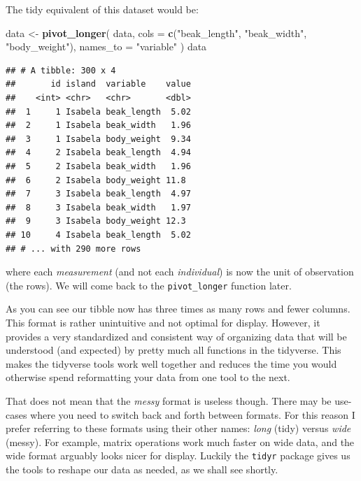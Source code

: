 \documentclass[]{book}
\newenvironment{Shaded}{}{}
\newcommand{\DataTypeTok}[1]{\textcolor[rgb]{0.56,0.13,0.00}{#1}}
\newcommand{\KeywordTok}[1]{\textcolor[rgb]{0.00,0.44,0.13}{\textbf{#1}}}
\newcommand{\NormalTok}[1]{#1}
\newcommand{\StringTok}[1]{\textcolor[rgb]{0.25,0.44,0.63}{#1}}
\begin{document}
The tidy equivalent of this dataset would be:

\begin{Shaded}
\begin{Highlighting}[]
\NormalTok{data <-}\StringTok{ }\KeywordTok{pivot_longer}\NormalTok{(}
\NormalTok{  data, }
  \DataTypeTok{cols =} \KeywordTok{c}\NormalTok{(}\StringTok{"beak_length"}\NormalTok{, }\StringTok{"beak_width"}\NormalTok{, }\StringTok{"body_weight"}\NormalTok{),}
  \DataTypeTok{names_to =} \StringTok{"variable"}
\NormalTok{)}
\NormalTok{data}
\end{Highlighting}
\end{Shaded}

\begin{verbatim}
## # A tibble: 300 x 4
##       id island  variable    value
##    <int> <chr>   <chr>       <dbl>
##  1     1 Isabela beak_length  5.02
##  2     1 Isabela beak_width   1.96
##  3     1 Isabela body_weight  9.34
##  4     2 Isabela beak_length  4.94
##  5     2 Isabela beak_width   1.96
##  6     2 Isabela body_weight 11.8 
##  7     3 Isabela beak_length  4.97
##  8     3 Isabela beak_width   1.97
##  9     3 Isabela body_weight 12.3 
## 10     4 Isabela beak_length  5.02
## # ... with 290 more rows
\end{verbatim}

where each \emph{measurement} (and not each \emph{individual}) is now the unit of observation (the rows). We will come back to the \texttt{pivot\_longer} function later.

As you can see our tibble now has three times as many rows and fewer columns. This format is rather unintuitive and not optimal for display. However, it provides a very standardized and consistent way of organizing data that will be understood (and expected) by pretty much all functions in the tidyverse. This makes the tidyverse tools work well together and reduces the time you would otherwise spend reformatting your data from one tool to the next.

That does not mean that the \emph{messy} format is useless though. There may be use-cases where you need to switch back and forth between formats. For this reason I prefer referring to these formats using their other names: \emph{long} (tidy) versus \emph{wide} (messy). For example, matrix operations work much faster on wide data, and the wide format arguably looks nicer for display. Luckily the \texttt{tidyr} package gives us the tools to reshape our data as needed, as we shall see shortly.
\end{document}
